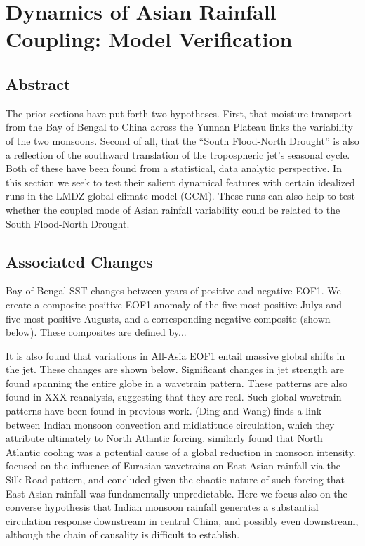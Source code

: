 \chapter{Dynamics of Asian Rainfall Coupling: Model Verification }

\section{Abstract}
The prior sections have put forth two hypotheses. First, that moisture transport from the Bay of Bengal to China across the Yunnan Plateau links the variability of the two monsoons. Second of all, that the ``South Flood-North Drought'' is also a reflection of the southward translation of the tropospheric jet's seasonal cycle. Both of these have been found from a statistical, data analytic perspective. In this section we seek to test their salient dynamical features with certain idealized runs in the LMDZ global climate model (GCM). These runs can also help to test whether the coupled mode of Asian rainfall variability could be related to the South Flood-North Drought.

\section{Associated Changes}

Bay of Bengal SST changes between years of positive and negative EOF1. We create a composite positive EOF1 anomaly of the five most positive Julys and five most positive Augusts, and a corresponding negative composite (shown below). These composites are defined by...

It is also found that variations in All-Asia EOF1 entail massive global shifts in the jet. These changes are shown below. Significant changes in jet strength are found spanning the entire globe in a wavetrain pattern. These patterns are also found in XXX reanalysis, suggesting that they are real. Such global wavetrain patterns have been found in previous work. \citet{Ding2007} (Ding and Wang) finds a link between Indian monsoon convection and midlatitude circulation, which they attribute ultimately to North Atlantic forcing. \citet{Liu2012} similarly found that North Atlantic cooling was a potential cause of a global reduction in monsoon intensity. \citet{Kosaka2012} focused on the influence of Eurasian wavetrains on East Asian rainfall via the Silk Road pattern, and concluded given the chaotic nature of such forcing that East Asian rainfall was fundamentally unpredictable. Here we focus also on the converse hypothesis that Indian monsoon rainfall generates a substantial circulation response downstream in central China, and possibly even downstream, although the chain of causality is difficult to establish.

